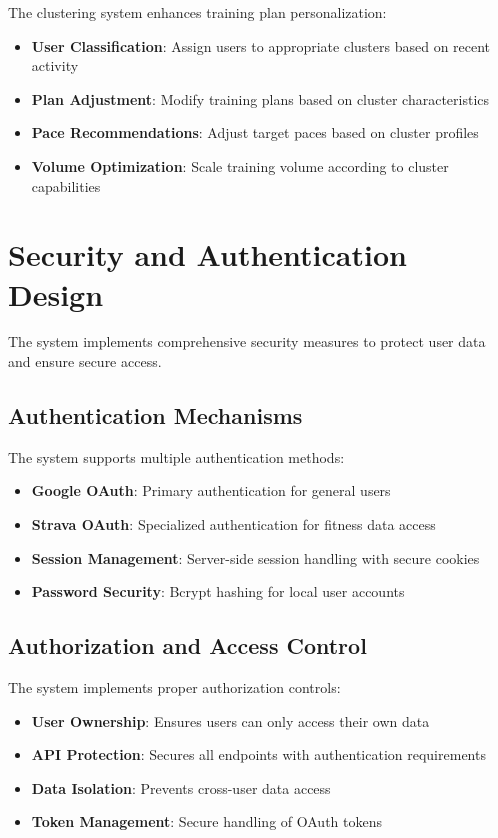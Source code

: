 The clustering system enhances training plan personalization:

\begin{itemize}
    \item \textbf{User Classification}: Assign users to appropriate clusters based on recent activity
    \item \textbf{Plan Adjustment}: Modify training plans based on cluster characteristics
    \item \textbf{Pace Recommendations}: Adjust target paces based on cluster profiles
    \item \textbf{Volume Optimization}: Scale training volume according to cluster capabilities
\end{itemize}

\section{Security and Authentication Design}

The system implements comprehensive security measures to protect user data and ensure secure access.

\subsection{Authentication Mechanisms}

The system supports multiple authentication methods:

\begin{itemize}
    \item \textbf{Google OAuth}: Primary authentication for general users
    \item \textbf{Strava OAuth}: Specialized authentication for fitness data access
    \item \textbf{Session Management}: Server-side session handling with secure cookies
    \item \textbf{Password Security}: Bcrypt hashing for local user accounts
\end{itemize}

\subsection{Authorization and Access Control}

The system implements proper authorization controls:

\begin{itemize}
    \item \textbf{User Ownership}: Ensures users can only access their own data
    \item \textbf{API Protection}: Secures all endpoints with authentication requirements
    \item \textbf{Data Isolation}: Prevents cross-user data access
    \item \textbf{Token Management}: Secure handling of OAuth tokens
\end{itemize}

